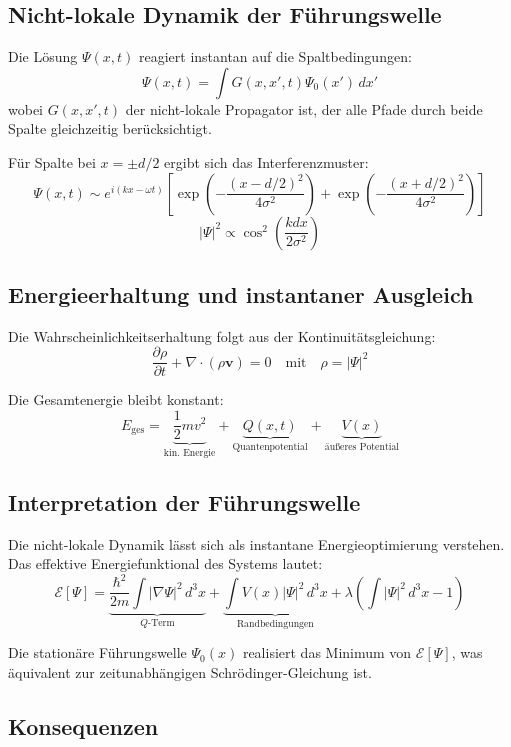 \subsection{Nicht-lokale Dynamik der Führungswelle}

Die Lösung $\Psi(x,t)$ reagiert instantan auf die Spaltbedingungen:
\[ \Psi(x,t) = \int G(x,x',t)\Psi_0(x')\,dx' \]
wobei $G(x,x',t)$ der nicht-lokale Propagator ist, der alle Pfade durch beide Spalte gleichzeitig berücksichtigt.

Für Spalte bei $x = \pm d/2$ ergibt sich das Interferenzmuster:
\[ \Psi(x,t) \sim e^{i(kx-\omega t)}\left[\exp\left(-\frac{(x-d/2)^2}{4\sigma^2}\right) + \exp\left(-\frac{(x+d/2)^2}{4\sigma^2}\right)\right] \]
\[ |\Psi|^2 \propto \cos^2\left(\frac{kdx}{2\sigma^2}\right) \]

\subsection{Energieerhaltung und instantaner Ausgleich}

Die Wahrscheinlichkeitserhaltung folgt aus der Kontinuitätsgleichung:
\[ \frac{\partial\rho}{\partial t} + \nabla\cdot(\rho\mathbf{v}) = 0 \quad \text{mit} \quad \rho = |\Psi|^2 \]

Die Gesamtenergie bleibt konstant:
\[ E_{\text{ges}} = \underbrace{\frac{1}{2}mv^2}_{\text{kin. Energie}} + \underbrace{Q(x,t)}_{\text{Quantenpotential}} + \underbrace{V(x)}_{\text{äußeres Potential}} \]

\subsection{Interpretation der Führungswelle}

Die nicht-lokale Dynamik lässt sich als instantane Energieoptimierung verstehen. Das effektive Energiefunktional des Systems lautet:
\[ \mathcal{E}[\Psi] = \underbrace{\frac{\hbar^2}{2m}\int|\nabla\Psi|^2\,d^3x}_{Q\text{-Term}} + \underbrace{\int V(x)|\Psi|^2\,d^3x}_{\text{Randbedingungen}} + \lambda\left(\int|\Psi|^2\,d^3x - 1\right) \]

Die stationäre Führungswelle $\Psi_0(x)$ realisiert das Minimum von $\mathcal{E}[\Psi]$, was äquivalent zur zeitunabhängigen Schrödinger-Gleichung ist.

\subsection{Konsequenzen}

